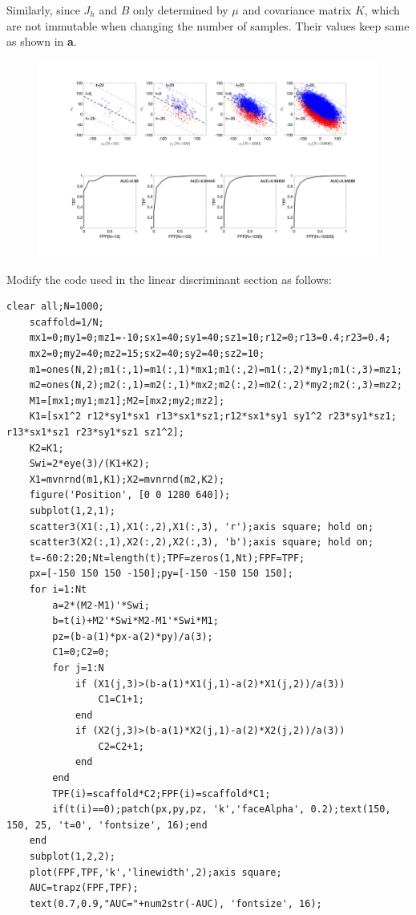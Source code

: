 \documentclass[12pt,a4paper]{article}
\begin{document}
    Similarly, since $J_h$ and $B$ only determined by $\mu$ and covariance matrix $K$, which are not immutable when changing the number of samples. Their values keep same as shown in \textbf{a}. 
    \begin{figure}[!ht]
        \includegraphics[width=\textwidth]{hw9_3d.png}
    \end{figure}

    \newpage
    Modify the code used in the linear discriminant section as follows:
    \begin{lstlisting}[basicstyle=\tiny]
    clear all;N=1000;
    scaffold=1/N;
    mx1=0;my1=0;mz1=-10;sx1=40;sy1=40;sz1=10;r12=0;r13=0.4;r23=0.4;
    mx2=0;my2=40;mz2=15;sx2=40;sy2=40;sz2=10;
    m1=ones(N,2);m1(:,1)=m1(:,1)*mx1;m1(:,2)=m1(:,2)*my1;m1(:,3)=mz1;
    m2=ones(N,2);m2(:,1)=m2(:,1)*mx2;m2(:,2)=m2(:,2)*my2;m2(:,3)=mz2;
    M1=[mx1;my1;mz1];M2=[mx2;my2;mz2];
    K1=[sx1^2 r12*sy1*sx1 r13*sx1*sz1;r12*sx1*sy1 sy1^2 r23*sy1*sz1; r13*sx1*sz1 r23*sy1*sz1 sz1^2];
    K2=K1;
    Swi=2*eye(3)/(K1+K2);
    X1=mvnrnd(m1,K1);X2=mvnrnd(m2,K2);
    figure('Position', [0 0 1280 640]);
    subplot(1,2,1);
    scatter3(X1(:,1),X1(:,2),X1(:,3), 'r');axis square; hold on;
    scatter3(X2(:,1),X2(:,2),X2(:,3), 'b');axis square; hold on;
    t=-60:2:20;Nt=length(t);TPF=zeros(1,Nt);FPF=TPF;
    px=[-150 150 150 -150];py=[-150 -150 150 150];
    for i=1:Nt
        a=2*(M2-M1)'*Swi;
        b=t(i)+M2'*Swi*M2-M1'*Swi*M1;
        pz=(b-a(1)*px-a(2)*py)/a(3);
        C1=0;C2=0;
        for j=1:N
            if (X1(j,3)>(b-a(1)*X1(j,1)-a(2)*X1(j,2))/a(3))
                C1=C1+1;
            end
            if (X2(j,3)>(b-a(1)*X2(j,1)-a(2)*X2(j,2))/a(3))
                C2=C2+1;
            end
        end
        TPF(i)=scaffold*C2;FPF(i)=scaffold*C1;
        if(t(i)==0);patch(px,py,pz, 'k','faceAlpha', 0.2);text(150, 150, 25, 't=0', 'fontsize', 16);end
    end
    subplot(1,2,2);
    plot(FPF,TPF,'k','linewidth',2);axis square;
    AUC=trapz(FPF,TPF);
    text(0.7,0.9,"AUC="+num2str(-AUC), 'fontsize', 16);
    \end{lstlisting}
\end{document}

